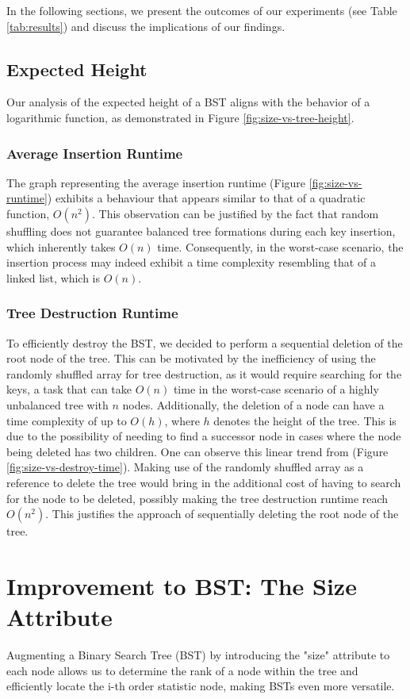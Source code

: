 \documentclass[a4paper,twoside,12pt]{report}
\begin{document}
In the following sections, we present the outcomes of our experiments (see Table \ref{tab:results}) and discuss the implications of our findings.

\section{Expected Height}
Our analysis of the expected height of a BST aligns with the behavior of a logarithmic function, as demonstrated in Figure \ref{fig:size-vs-tree-height}.

\subsection{Average Insertion Runtime}
The graph representing the average insertion runtime (Figure \ref{fig:size-vs-runtime}) exhibits a behaviour that appears similar to that of a quadratic function, $O(n^2)$. This observation can be justified by the fact that random shuffling does not guarantee balanced tree formations during each key insertion, which inherently takes $O(n)$ time. Consequently, in the worst-case scenario, the insertion process may indeed exhibit a time complexity resembling that of a linked list, which is $O(n)$.

\subsection{Tree Destruction Runtime}
To efficiently destroy the BST, we decided to perform a sequential deletion of the root node of the tree. This can be motivated by the inefficiency of using the randomly shuffled array for tree destruction, as it would require searching for the keys, a task that can take $O(n)$ time in the worst-case scenario of a highly unbalanced tree with $n$ nodes. Additionally, the deletion of a node can have a time complexity of up to $O(h)$, where $h$ denotes the height of the tree. This is due to the possibility of needing to find a successor node in cases where the node being deleted has two children. 
One can observe this linear trend from (Figure \ref{fig:size-vs-destroy-time}). Making use of the randomly shuffled array as a reference to delete the tree would bring in the additional cost of having to search for the node to be deleted, possibly making the tree destruction runtime reach $O(n^2)$. This justifies the approach of sequentially deleting the root node of the tree.


\chapter{Improvement to BST: The Size Attribute}
Augmenting a Binary Search Tree (BST) by introducing the "size" attribute to each node allows us to determine the rank of a node within the tree and efficiently locate the i-th order statistic node, making BSTs even more versatile.
\end{document}
